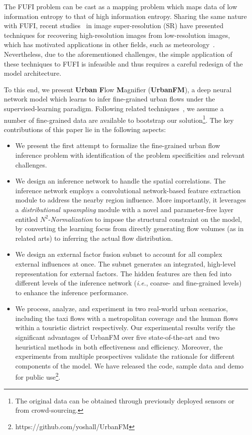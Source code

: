 The FUFI problem can be cast as a mapping problem which maps data of low information entropy to that of high information entropy. Sharing the same nature with FUFI, recent studies~\cite{dong2016srcnn,lim2017enhanced,ledig2017srgan} in image super-resolution (SR) have presented techniques for recovering high-resolution images from low-resolution images, which has motivated applications in other fields, such as meteorology~\cite{vandal2017deepsd}. Nevertheless, due to the aforementioned challenges, the simple application of these techniques to FUFI is infeasible and thus requires a careful redesign of the model architecture.

To this end, we present \textbf{Urban} \textbf{F}low \textbf{M}agnifier (\textbf{UrbanFM}), a deep neural network model which learns to infer fine-grained urban flows under the supervised-learning paradigm. Following related techniques~\cite{dong2016srcnn,lim2017enhanced,ledig2017srgan,vandal2017deepsd}, we assume a number of fine-grained data are available to bootstrap our solution\footnote{The original data can be obtained through previously deployed sensors or from crowd-sourcing.}. The key contributions of this paper lie in the following aspects:
\begin{itemize}[leftmargin=*]
\item{We present the first attempt to formalize the fine-grained urban flow inference problem with identification of the problem specificities and relevant challenges.}
\item{We design an inference network to handle the spatial correlations. The inference network employs a convolutional network-based feature extraction module to address the nearby region influence. More importantly, it leverages a   \textit{distributional upsampling} module with a novel and parameter-free layer entitled $N^2$-\textit{Normalization} to impose the structural constraint on the model, by converting the learning focus from directly generating flow volumes (as in related arts) to inferring the actual flow distribution.}
\item{We design an external factor fusion subnet to account for all complex external influences at once. The subnet generates an integrated, high-level representation for external factors. The hidden features are then fed into different levels of the inference network (\emph{i.e.}, coarse- and fine-grained levels) to enhance the inference performance.}
\item{We process, analyze, and experiment in two real-world urban scenarios, including the taxi flows with a metropolitan coverage and the human flows within a touristic district respectively. Our experimental results verify the significant advantages of UrbanFM over five state-of-the-art and two heuristical methods in both effectiveness and efficiency. Moreover, the experiments from multiple prospectives validate the rationale for different components of the model. We have released the code, sample data and demo for public use\footnote{https://github.com/yoshall/UrbanFM}.}
\end{itemize}




